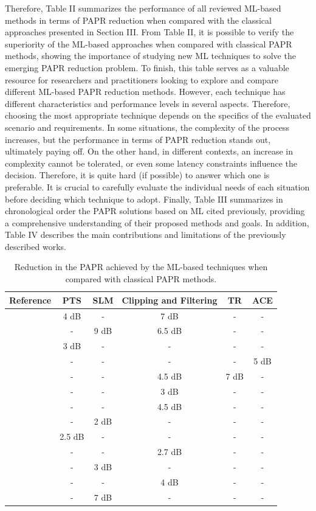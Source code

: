 \documentclass[conference]{IEEEtran}
\begin{document}
Therefore, Table II summarizes the performance of all reviewed ML-based methods in terms of PAPR reduction when compared with the classical approaches presented in Section III. From Table II, it is possible to verify the superiority of the ML-based approaches when compared with classical PAPR methods, showing the importance of studying new ML techniques to solve the emerging PAPR reduction problem. To finish, this table serves as a valuable resource for researchers and practitioners looking to explore and compare different ML-based PAPR reduction methods. However, each technique has different characteristics and performance levels in several aspects. Therefore, choosing the most appropriate technique depends on the specifics of the evaluated scenario and requirements. In some situations, the complexity of the process increases, but the performance in terms of PAPR reduction stands out, ultimately paying off. On the other hand, in different contexts, an increase in complexity cannot be tolerated, or even some latency constraints influence the decision. Therefore, it is quite hard (if possible) to answer which one is preferable. It is crucial to carefully evaluate the individual needs of each situation before deciding which technique to adopt. Finally, Table III summarizes in chronological order the PAPR solutions based on ML cited previously, providing a comprehensive understanding of their proposed methods and goals. In addition, Table IV describes the main contributions and limitations of the previously described works.

\begin{table}[t]
\caption{Reduction in the PAPR achieved by the ML-based techniques when compared with classical PAPR methods.}
\begin{center}
\begin{tabular}{|c|c|c|c|c|c|}
\hline
\textbf{Reference} & \textbf{PTS} & \textbf{SLM} & \textbf{Clipping and Filtering} & \textbf{TR} & \textbf{ACE} \\
\hline
\cite{b141} & 4 dB & - & 7 dB & - & - \\
\hline
\cite{b143} & - & 9 dB & 6.5 dB & - & - \\
\hline
\cite{b147} & 3 dB & - & - & - & - \\
\hline
\cite{b142} & - & - & - & - & 5 dB \\
\hline
\cite{b148} & - & - & 4.5 dB & 7 dB & - \\
\hline
\cite{b145} & - & - & 3 dB & - & - \\
\hline
\cite{b134} & - & - & 4.5 dB & - & - \\
\hline
\cite{b149} & - & 2 dB & - & - & - \\
\hline
\cite{b155} & 2.5 dB & - & - & - & - \\
\hline
\cite{b146} & - & - & 2.7 dB & - & - \\
\hline
\cite{b152} & - & 3 dB & - & - & - \\
\hline
\cite{b153} & - & - & 4 dB & - & - \\
\hline
\cite{b144} & - & 7 dB & - & - & - \\
\hline
\end{tabular}
\label{tab2}
\end{center}
\end{table}
\end{document}
